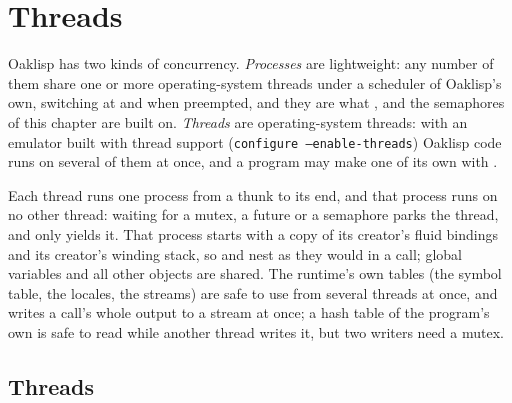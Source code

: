 
\chapter{Threads} \label{threads}

Oaklisp has two kinds of concurrency.  \emph{Processes} are
lightweight: any number of them share one or more operating-system
threads under a scheduler of Oaklisp's own, switching at
 and when preempted, and they are what ,
 and the semaphores of this chapter are built on.
\emph{Threads} are operating-system threads: with an emulator built
with thread support (\texttt{configure --enable-threads}) Oaklisp
code runs on several of them at once, and a program may make one of
its own with .

Each thread runs one process from a thunk to its end, and that
process runs on no other thread: waiting for a mutex, a future or a
semaphore parks the thread, and  only yields it.  That process
starts with a copy of its creator's fluid bindings and its creator's
winding stack, so  and  nest as they would
in a call; global variables and all other objects are shared.  The
runtime's own tables (the symbol table, the locales, the streams) are
safe to use from several threads at once, and  writes a
call's whole output to a stream at once; a hash table of the program's
own is safe to read while another thread writes it, but two writers
need a mutex.

\section{Threads}



